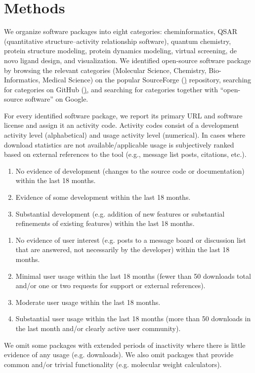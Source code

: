 \section{Methods}

We organize software packages into eight categories: cheminformatics, QSAR (quantitative structure–activity relationship software), quantum chemistry, protein structure modeling, protein dynamics modeling, virtual screening, de novo ligand design, and visualization.
We identified open-source software package by browsing the relevant categories (Molecular Science, Chemistry, Bio-Informatics, Medical Science) on the popular SourceForge (\href{http://sourceforge.net}) repository, searching for categories on GitHub (\href{http://github.com}), and searching for categories together with ``open-source software'' on Google.

For every identified software package, we report its primary URL and software license and assign it an activity code. Activity codes consist of a development activity level (alphabetical) and usage activity level (numerical). In cases where download statistics are not available/applicable usage is subjectively ranked based on external references to the tool (e.g., message list posts, citations, etc.).
\begin{enumerate}
\renewcommand{\theenumi}{\Alph{enumi}}
  \item No evidence of development (changes to the source code or documentation) within the last 18 months.
  \item Evidence of some development within the last 18 months.
  \item Substantial development (e.g. addition of new features or substantial refinements of existing features) within the last 18 months.
\end{enumerate}
\begin{enumerate}
  \item No evidence of user interest (e.g. posts to a message board or discussion list that are answered, not necessarily by the developer) within the last 18 months.
  \item Minimal user usage within the last 18 months (fewer than 50 downloads total and/or one or two requests for support or external references).
  \item Moderate user usage within the last 18 months.
  \item Substantial user usage within the last 18 months (more than 50 downloads in the last month and/or clearly active user community).
\end{enumerate}

We omit some packages with extended periods of inactivity where there is little evidence of any usage (e.g. downloads).  We also omit packages that provide common and/or trivial functionality (e.g. molecular weight calculators).



 
 

  
  